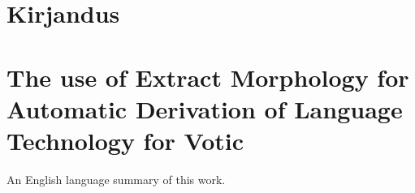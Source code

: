 \documentclass[12pt,a4paper]{article}
\begin{document}
\newpage
\section{Kirjandus}
\label{sec:kirjandus}
{
  \renewcommand*{\bibfont}{\small}
  \printbibliography[heading=none]
}







\newpage
\section{The use of Extract Morphology for Automatic Derivation of Language Technology for Votic}

An English language summary of this work.
\end{document}
